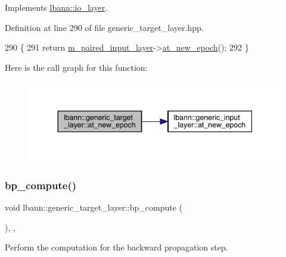 Implements \hyperlink{classlbann_1_1io__layer_a0cedc21bf38c1e3d60a93b41981a1626}{lbann\+::io\+\_\+layer}.



Definition at line 290 of file generic\+\_\+target\+\_\+layer.\+hpp.


\begin{DoxyCode}
290                                      \{
291     \textcolor{keywordflow}{return} \hyperlink{classlbann_1_1generic__target__layer_a84da1260e9feb4fbc3e6f2315e4cab4b}{m\_paired\_input\_layer}->\hyperlink{classlbann_1_1generic__input__layer_a8b375ab97f38166872e4aa9baeca0715}{at\_new\_epoch}();
292   \}
\end{DoxyCode}
Here is the call graph for this function\+:\nopagebreak
\begin{figure}[H]
\begin{center}
\leavevmode
\includegraphics[width=344pt]{classlbann_1_1generic__target__layer_a9bdeadd84f0b4f31b755fdd338492b1a_cgraph}
\end{center}
\end{figure}
\mbox{\label{classlbann_1_1generic__target__layer_ab29b31c81b115acd7e01de25ef190b99}} 
\subsubsection{\texorpdfstring{bp\+\_\+compute()}{bp\_compute()}}
{\footnotesize\ttfamily void lbann\+::generic\+\_\+target\+\_\+layer\+::bp\+\_\+compute (\begin{DoxyParamCaption}{ }\end{DoxyParamCaption})\hspace{0.3cm}{\ttfamily [inline]}, {\ttfamily [override]}, {\ttfamily [virtual]}}

Perform the computation for the backward propagation step. 

